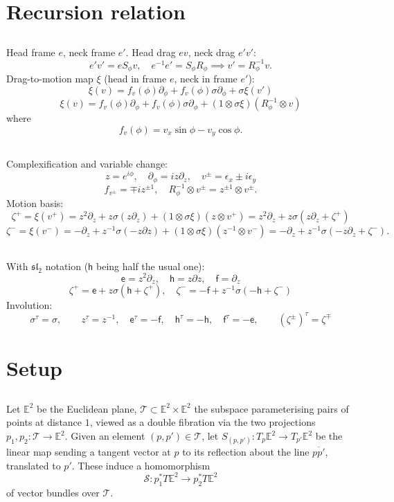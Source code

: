 \documentclass{amsart}
\def\EE{\mathbb{E}}
\def\e{\mathsf{e}}
\def\h{\mathsf{h}}
\def\f{\mathsf{f}}
\def\sT{\mathscr{T}}
\def\sS{\mathscr{S}}
\def\inv{\tau} %
\theoremstyle{definition}
\begin{document}
\section{Recursion relation}
\subsection{}
Head frame $e$, neck frame $e'$. Head drag $ev$, neck drag $e'v'$:
$$ e'v'= e S_\phi v,\quad e^{-1}e' = S_\phi R_\phi \implies v' = R_{\phi}^{-1}v. $$
Drag-to-motion map $\xi$ (head in frame $e$, neck in frame $e'$):
$$ \xi(v) = f_v(\phi)\partial_\phi + f_v(\phi)\sigma\partial_\phi + \sigma \xi(v') $$
$$ \xi(v) = f_v(\phi)\partial_\phi + f_v(\phi)\sigma\partial_\phi + (1\otimes\sigma\xi)(R_\phi^{-1}\otimes v) $$
where
$$ f_v(\phi) = v_x\sin\phi - v_y\cos\phi.$$
\subsection{}
Complexification and variable change:
$$ z = e^{i\phi},\quad \partial_\phi = iz\partial_z,\quad v^\pm = \epsilon_x \pm i\epsilon_y $$
$$ f_{v^\pm} = \mp i z^{\pm 1},\quad
R_\phi^{-1} \otimes v^{\pm} = z^{\pm 1} \otimes v^{\pm}.$$
Motion basis:
$$ \zeta^+ = \xi(v^+) = z^2\partial_z + z \sigma (z\partial_z) + (1\otimes \sigma\xi)(z\otimes v^+)
= z^2\partial_z + z\sigma(z\partial_z + \zeta^+) $$
$$ \zeta^- = \xi(v^-) =- \partial_z + z^{-1}\sigma(-z\partial z) + (1\otimes\sigma\xi)(z^{-1}\otimes v^-)
= -\partial_z + z^{-1}\sigma(-z\partial_z + \zeta^-). $$
\subsection{}
With $\mathfrak{sl}_2$ notation ($\h$ being half the usual one):
$$ \e = z^2\partial_z,\quad \h = z\partial z,\quad \f = \partial_z $$
$$\zeta^+ = \e + z\sigma(\h + \zeta^+),\quad \zeta^- = -\f + z^{-1}\sigma(-\h + \zeta^-)$$
Involution:
$$ \sigma^\inv=\sigma,\qquad z^\inv = z^{-1},\quad \e^\inv=-\f,\quad \h^\inv=-\h,\quad \f^\inv=-\e,
\qquad
\left(\zeta^{\pm}\right)^\inv=\zeta^\mp $$


\section{Setup}

\subsection{}
Let $\EE^2$ be the Euclidean plane, $\sT \subset \EE^2 \times \EE^2$
the subspace parameterising pairs of points at distance $1$, viewed
as a double fibration via the two projections $p_1,p_2 : \sT \to \EE^2$.
Given an element
$(p,p') \in \sT$, let $S_{(p,p')} : T_p\EE^2 \to T_{p'}\EE^2$
be the linear map sending a tangent vector at $p$ to
its reflection about the line $\overline{pp'}$, translated
to $p'$. These induce a homomorphism 
$$ \sS : p_1^* T\EE^2 \to p_2^* T\EE^2  $$
of vector bundles over $\sT$.
\end{document}
